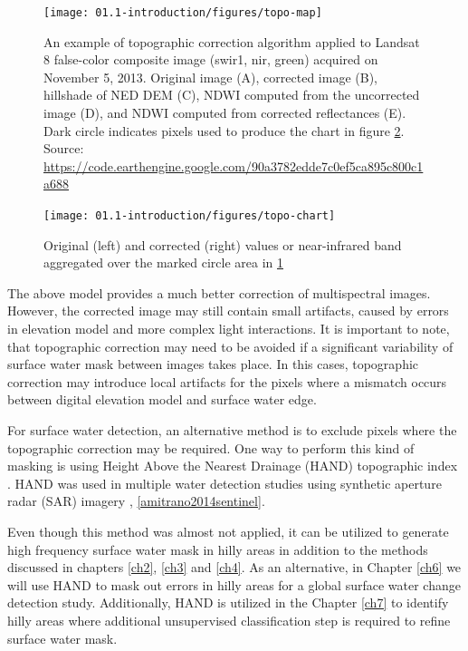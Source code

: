 \begin{figure}[H]
	\texttt{[image: 01.1-introduction/figures/topo-map]}
	\caption{An example of topographic correction algorithm \cite{tan2013improved} applied to Landsat 8 false-color composite image (swir1, nir, green) acquired on November 5, 2013. Original image (A), corrected image (B), hillshade of NED DEM (C), NDWI computed from the uncorrected image (D), and NDWI computed from corrected reflectances (E). Dark circle indicates pixels used to produce the chart in figure \ref{fig:ch1-topo-chart}.  Source: \url{https://code.earthengine.google.com/90a3782edde7c0ef5ca895c800c1a688}}
	\label{fig:ch1-topo-map}
\end{figure}


\begin{figure}[H]
	\texttt{[image: 01.1-introduction/figures/topo-chart]}
	\caption{Original (left) and corrected (right) values or near-infrared band aggregated over the marked circle area in \protect \ref{fig:ch1-topo-map}}
	\label{fig:ch1-topo-chart}
\end{figure}


The above model provides a much better correction of multispectral images. However, the corrected image may still contain small artifacts, caused by errors in elevation model and more complex light interactions. It is important to note, that topographic correction may need to be avoided if a significant variability of surface water mask between images takes place. In this cases, topographic correction may introduce local artifacts for the pixels where a mismatch occurs between digital elevation model and surface water edge.

For surface water detection, an alternative method is to exclude pixels where the topographic correction may be required. One way to perform this kind of masking is using Height Above the Nearest Drainage (HAND) topographic index \cite{Renno2008, Nobre2011}. HAND was used in multiple water detection studies using synthetic aperture radar (SAR) imagery \citep{Eilander2014}, \ref{amitrano2014sentinel}. 


Even though this method was almost not applied, it can be utilized to generate high frequency surface water mask in hilly areas in addition to the methods discussed in chapters \ref{ch2}, \ref{ch3} and \ref{ch4}. As an alternative, in Chapter \ref{ch6} we will use HAND to mask out errors in hilly areas for a global surface water change detection study. Additionally, HAND is utilized in the Chapter \ref{ch7} to identify hilly areas where additional unsupervised classification step is required to refine surface water mask.

